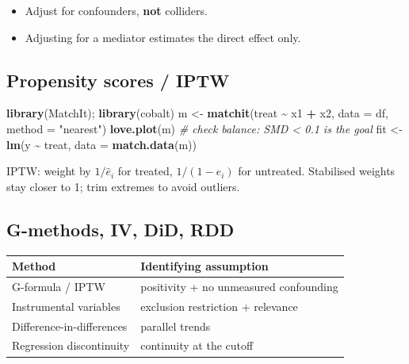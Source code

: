 \documentclass[
]{article}
\newenvironment{Shaded}{\begin{snugshade}}{\end{snugshade}}
\newcommand{\AttributeTok}[1]{\textcolor[rgb]{0.13,0.29,0.53}{#1}}
\newcommand{\CommentTok}[1]{\textcolor[rgb]{0.56,0.35,0.01}{\textit{#1}}}
\newcommand{\FunctionTok}[1]{\textcolor[rgb]{0.13,0.29,0.53}{\textbf{#1}}}
\newcommand{\NormalTok}[1]{#1}
\newcommand{\OtherTok}[1]{\textcolor[rgb]{0.56,0.35,0.01}{#1}}
\newcommand{\SpecialCharTok}[1]{\textcolor[rgb]{0.81,0.36,0.00}{\textbf{#1}}}
\newcommand{\StringTok}[1]{\textcolor[rgb]{0.31,0.60,0.02}{#1}}
\newcounter{none} %
\providecommand{\tightlist}{%
  \setlength{\itemsep}{0pt}\setlength{\parskip}{0pt}}
\begin{document}
\begin{itemize}
\tightlist
\item
  Adjust for confounders, \textbf{not} colliders.
\item
  Adjusting for a mediator estimates the direct effect only.
\end{itemize}

\subsection{Propensity scores / IPTW}\label{propensity-scores-iptw}

\begin{Shaded}
\begin{Highlighting}[]
\FunctionTok{library}\NormalTok{(MatchIt); }\FunctionTok{library}\NormalTok{(cobalt)}
\NormalTok{m }\OtherTok{\textless{}{-}} \FunctionTok{matchit}\NormalTok{(treat }\SpecialCharTok{\textasciitilde{}}\NormalTok{ x1 }\SpecialCharTok{+}\NormalTok{ x2, }\AttributeTok{data =}\NormalTok{ df, }\AttributeTok{method =} \StringTok{"nearest"}\NormalTok{)}
\FunctionTok{love.plot}\NormalTok{(m)   }\CommentTok{\# check balance: SMD \textless{} 0.1 is the goal}
\NormalTok{fit }\OtherTok{\textless{}{-}} \FunctionTok{lm}\NormalTok{(y }\SpecialCharTok{\textasciitilde{}}\NormalTok{ treat, }\AttributeTok{data =} \FunctionTok{match.data}\NormalTok{(m))}
\end{Highlighting}
\end{Shaded}

IPTW: weight by \(1/\hat{e}_i\) for treated, \(1/(1-\hat{e}_i)\) for
untreated. Stabilised weights stay closer to 1; trim extremes to avoid
outliers.

\subsection{G-methods, IV, DiD, RDD}\label{g-methods-iv-did-rdd}

{\def\LTcaptype{none} %
\begin{longtable}[]{@{}ll@{}}
\toprule\noalign{}
Method & Identifying assumption \\
\midrule\noalign{}
\endhead
\bottomrule\noalign{}
\endlastfoot
G-formula / IPTW & positivity + no unmeasured confounding \\
Instrumental variables & exclusion restriction + relevance \\
Difference-in-differences & parallel trends \\
Regression discontinuity & continuity at the cutoff \\
\end{longtable}
}
\end{document}
